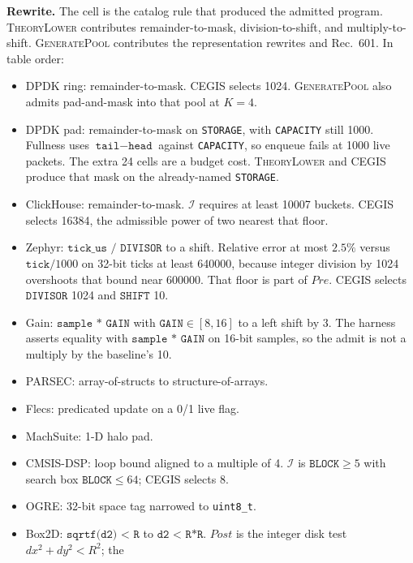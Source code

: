 \textbf{Rewrite.} The cell is the catalog rule that produced the admitted
program. \textsc{TheoryLower} contributes remainder-to-mask, division-to-shift,
and multiply-to-shift. \textsc{GeneratePool} contributes the representation
rewrites and Rec.~601. In table order:
\label{sec:gold_rewrites}
\begin{itemize}
  \item DPDK ring: remainder-to-mask. CEGIS selects 1024.
  \textsc{GeneratePool} also admits pad-and-mask into that pool at \(K=4\).
  \item DPDK pad: remainder-to-mask on \texttt{STORAGE}, with
  \texttt{CAPACITY} still 1000. Fullness uses
  \(\texttt{tail}-\texttt{head}\) against \texttt{CAPACITY}, so enqueue
  fails at 1000 live packets. The extra 24 cells are a budget cost.
  \textsc{TheoryLower} and CEGIS produce that mask on the already-named
  \texttt{STORAGE}.
  \label{sec:unexposed_eval}
  \item ClickHouse: remainder-to-mask. \(\mathcal{I}\) requires at least
  10007 buckets. CEGIS selects 16384, the admissible power of two nearest
  that floor.
  \item Zephyr: \(\texttt{tick\_us / DIVISOR}\) to a shift. Relative error
  at most \(2.5\%\) versus \(\texttt{tick}/1000\) on 32-bit ticks at least
  640000, because integer division by 1024 overshoots that bound near
  600000. That floor is part of \(\mathit{Pre}\). CEGIS selects
  \(\texttt{DIVISOR}\) 1024 and \(\texttt{SHIFT}\) 10.
  \label{sec:decimation_eval}
  \item Gain: \(\texttt{sample * GAIN}\) with \(\texttt{GAIN} \in [8,16]\)
  to a left shift by 3. The harness asserts equality with
  \(\texttt{sample * GAIN}\) on 16-bit samples, so the admit is not a
  multiply by the baseline's 10.
  \label{sec:scale_eval}
  \item PARSEC: array-of-structs to structure-of-arrays.
  \label{sec:soa_eval}
  \item Flecs: predicated update on a 0/1 live flag.
  \item MachSuite: 1-D halo pad.
  \item CMSIS-DSP: loop bound aligned to a multiple of 4.
  \(\mathcal{I}\) is \(\texttt{BLOCK} \ge 5\) with search box
  \(\texttt{BLOCK} \le 64\); CEGIS selects 8.
  \item OGRE: 32-bit space tag narrowed to \texttt{uint8\_t}.
  \item Box2D: \(\texttt{sqrtf(d2) < R}\) to \(\texttt{d2 < R*R}\).
  \(\mathit{Post}\) is the integer disk test \(dx^2+dy^2 < R^2\); the

\end{itemize}
